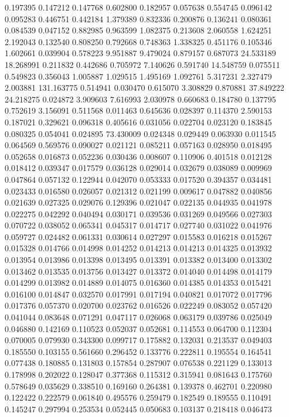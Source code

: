 0.197395
0.147212
0.147768
0.602800
0.182957
0.057638
0.554745
0.096142
0.095283
0.446751
0.442184
1.379389
0.832336
0.200876
0.136241
0.080361
0.084539
0.047152
0.882985
0.963599
1.082375
0.213608
2.060558
1.624251
2.192043
0.132540
0.808250
0.792668
0.748363
1.338325
0.451176
0.105346
1.602661
0.039904
0.578223
9.951887
9.479024
0.879157
0.687073
24.533189
18.268991
0.211832
0.442686
0.705972
7.140626
0.591740
14.548759
0.075511
0.549823
0.356043
1.005887
1.029515
1.495169
1.092761
5.317231
2.327479
2.003881
131.163775
0.514941
0.030470
0.615070
3.308829
0.870881
37.849222
24.218275
0.024872
3.909603
7.616993
2.030978
0.660683
0.184780
0.137795
0.752619
3.156091
0.511568
0.011463
0.645636
0.028397
0.114370
2.590153
0.187021
0.329621
0.096318
0.405616
0.031056
0.022704
0.023120
0.183845
0.080325
0.054041
0.024895
73.430009
0.024348
0.029449
0.063930
0.011545
0.064569
0.569576
0.090027
0.021121
0.085211
0.057163
0.028950
0.018495
0.052658
0.016873
0.052236
0.030436
0.008607
0.110906
0.401518
0.012128
0.018412
0.039347
0.017579
0.036128
0.029014
0.032679
0.038089
0.009969
0.047864
0.057132
0.122944
0.042070
0.053333
0.017520
0.394357
0.034481
0.023433
0.016580
0.026057
0.021312
0.021199
0.009617
0.047882
0.040856
0.021639
0.027325
0.029076
0.129396
0.021047
0.022135
0.044935
0.041978
0.022275
0.042292
0.040494
0.030171
0.039536
0.031269
0.049566
0.027303
0.070722
0.038052
0.065341
0.045317
0.014717
0.027740
0.031022
0.041976
0.059727
0.024482
0.061331
0.030614
0.027297
0.015583
0.016218
0.015267
0.015328
0.014766
0.014998
0.014252
0.014213
0.014213
0.014325
0.013932
0.013954
0.013986
0.013398
0.013495
0.013391
0.013382
0.013400
0.013302
0.013462
0.013535
0.013756
0.013427
0.013372
0.014040
0.014498
0.014179
0.014299
0.013982
0.014889
0.014075
0.016360
0.014385
0.014353
0.015421
0.016100
0.014847
0.032570
0.017991
0.017194
0.040821
0.017072
0.017796
0.017376
0.057370
0.020700
0.023762
0.016526
0.022249
0.083052
0.057420
0.041044
0.083648
0.071291
0.047117
0.026068
0.063179
0.039786
0.025049
0.046880
0.142169
0.110523
0.052037
0.052681
0.114553
0.064700
0.112304
0.070005
0.079930
0.343300
0.099717
0.175882
0.132031
0.213537
0.049403
0.185550
0.103155
0.561660
0.296452
0.133776
0.222811
0.195554
0.164541
0.077438
0.180885
0.131803
0.157854
0.287907
0.076538
0.221129
0.133013
0.178998
0.202022
0.128047
0.377368
0.115312
0.315941
0.081643
0.175760
0.578649
0.035629
0.338510
0.169160
0.264381
0.139378
0.462701
0.220980
0.122422
0.222579
0.061840
0.495576
0.259479
0.182549
0.189555
0.110491
0.145247
0.297994
0.253534
0.052445
0.050683
0.103137
0.218418
0.046473
